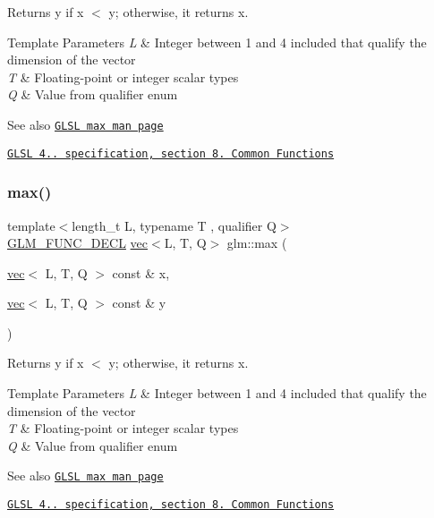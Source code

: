 Returns y if x $<$ y; otherwise, it returns x.


\begin{DoxyTemplParams}{Template Parameters}
{\em L} & Integer between 1 and 4 included that qualify the dimension of the vector \\
\hline
{\em T} & Floating-\/point or integer scalar types \\
\hline
{\em Q} & Value from qualifier enum\\
\hline
\end{DoxyTemplParams}
\begin{DoxySeeAlso}{See also}
\href{http://www.opengl.org/sdk/docs/manglsl/xhtml/max.xml}{\tt G\+L\+SL max man page} 

\href{http://www.opengl.org/registry/doc/GLSLangSpec.4.20.8.pdf}{\tt G\+L\+SL 4.. specification, section 8. Common Functions} 
\end{DoxySeeAlso}
\mbox{\label{group__core__func__common_gad48b723358c68d45477c22ff0101985e}} 
\subsubsection{\texorpdfstring{max()}{max()}\hspace{0.1cm}{\footnotesize\ttfamily [3/3]}}
{\footnotesize\ttfamily template$<$length\+\_\+t L, typename T , qualifier Q$>$ \\
\hyperlink{setup_8hpp_ab2d052de21a70539923e9bcbf6e83a51}{G\+L\+M\+\_\+\+F\+U\+N\+C\+\_\+\+D\+E\+CL} \hyperlink{structglm_1_1vec}{vec}$<$L, T, Q$>$ glm\+::max (\begin{DoxyParamCaption}\item[{\hyperlink{structglm_1_1vec}{vec}$<$ L, T, Q $>$ const \&}]{x,  }\item[{\hyperlink{structglm_1_1vec}{vec}$<$ L, T, Q $>$ const \&}]{y }\end{DoxyParamCaption})}

Returns y if x $<$ y; otherwise, it returns x.


\begin{DoxyTemplParams}{Template Parameters}
{\em L} & Integer between 1 and 4 included that qualify the dimension of the vector \\
\hline
{\em T} & Floating-\/point or integer scalar types \\
\hline
{\em Q} & Value from qualifier enum\\
\hline
\end{DoxyTemplParams}
\begin{DoxySeeAlso}{See also}
\href{http://www.opengl.org/sdk/docs/manglsl/xhtml/max.xml}{\tt G\+L\+SL max man page} 

\href{http://www.opengl.org/registry/doc/GLSLangSpec.4.20.8.pdf}{\tt G\+L\+SL 4.. specification, section 8. Common Functions} 
\end{DoxySeeAlso}
\mbox{\label{group__core__func__common_ga2c2bde1cec025b7ddff83c74a1113719}} 
